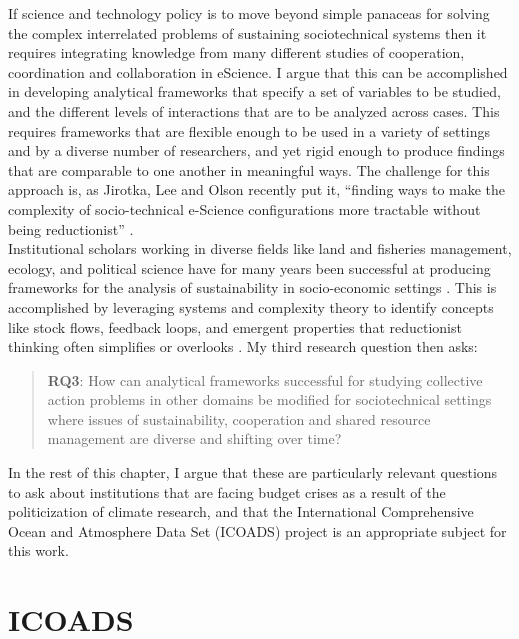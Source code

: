 \documentclass[thesis,tocnosub,noragright,centerchapter,12pt]{uiucecethesis09}
\begin{document}
If science and technology policy is to move beyond simple
panaceas for solving the complex interrelated problems of sustaining
sociotechnical systems then it requires integrating knowledge from many different studies of cooperation, coordination and collaboration in eScience. I argue that this can be accomplished in developing analytical frameworks that specify a set of variables to be studied, and the different levels of interactions that are to be analyzed across cases. This requires frameworks that are flexible enough to be used in a variety of settings and by a
diverse number of researchers, and yet rigid enough to produce findings
that are comparable to one another in meaningful ways. The challenge for this approach is, as Jirotka, Lee and Olson recently put it, ``finding ways to make the complexity of socio-technical e-Science configurations more tractable without being reductionist'' \citeyearpar[p. 31]{jirotka2013supporting}.\\

Institutional scholars working in diverse fields like land and fisheries management,
ecology, and political science have for many years been successful at
producing frameworks for the analysis of sustainability in socio-economic settings \citep{ostrom2007institutional}. This is accomplished by leveraging systems and complexity theory
\citep{ostrom2007diagnostic} to identify concepts like stock flows, feedback loops, and
emergent properties that reductionist thinking often simplifies or
overlooks \citep{meadows2008thinking}. My third research question then asks:

\begin{quote}
\textbf{RQ3}: How can analytical frameworks successful for studying
collective action problems in other domains be modified for
sociotechnical settings where issues of sustainability, cooperation and
shared resource management are diverse and shifting over time?
\end{quote}

In the rest of this chapter, I argue that these are particularly relevant
questions to ask about institutions that are facing budget crises as a
result of the politicization of climate research, and that the
International Comprehensive Ocean and Atmosphere Data Set (ICOADS) project is an appropriate subject for this work. 

\section{ICOADS}
\end{document}
